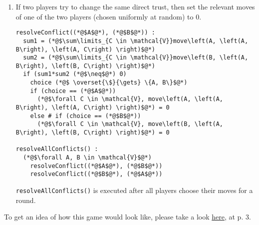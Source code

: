 \begin{enumerate}
  \newpage

  \item If two players try to change the same direct trust, then set the relevant moves of one of the two players (chosen
    uniformly at random) to 0.
  \begin{lstlisting}[label=conflict, style=numbers]
resolveConflict((*@$A$@*), (*@$B$@*)) :
  sum1 = (*@$\sum\limits_{C \in \mathcal{V}}move\left(A, \left(A, B\right), \left(A, C\right) \right)$@*)
  sum2 = (*@$\sum\limits_{C \in \mathcal{V}}move\left(B, \left(A, B\right), \left(B, C\right) \right)$@*)
  if (sum1*sum2 (*@$\neq$@*) 0)
    choice (*@$ \overset{\$}{\gets} \{A, B\}$@*)
    if (choice == (*@$A$@*))
      (*@$\forall C \in \mathcal{V}, move\left(A, \left(A, B\right), \left(A, C\right) \right)$@*) = 0
    else # if (choice == (*@$B$@*))
      (*@$\forall C \in \mathcal{V}, move\left(B, \left(A, B\right), \left(B, C\right) \right)$@*) = 0

resolveAllConflicts() :
  (*@$\forall A, B \in \mathcal{V}$@*)
    resolveConflict((*@$A$@*), (*@$B$@*))
    resolveConflict((*@$B$@*), (*@$A$@*))
  \end{lstlisting}
  \texttt{resolveAllConflicts()} is executed after all players choose their moves for a round.
\end{enumerate}

\noindent To get an idea of how this game would look like, please take a look
\href{http://www.agsm.edu.au/bobm/teaching/SGTM/lect06pr-3.pdf}{here}, at p. 3.

\hrulefill
\newpage
